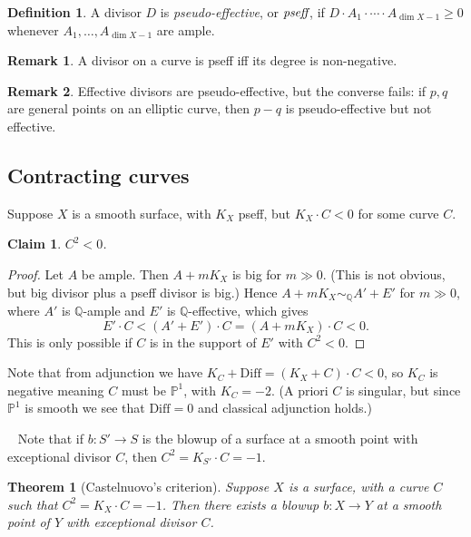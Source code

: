 \documentclass{article}
\newtheorem*{theorem}{Theorem}
\newtheorem*{claim}{Claim}
\theoremstyle{definition}
\newtheorem*{definition}{Definition}
\newtheorem*{remark}{Remark}
\newcommand{\Diff}{\mathrm{Diff}}
\renewcommand{\P}{\mathbb{P}}
\newcommand{\Q}{\mathbb{Q}}
\begin{document}
\begin{definition}
    A divisor $D$ is \emph{pseudo-effective}, or $\emph{pseff}$, if
    $D\cdot A_1\cdot\cdots\cdot A_{\dim X-1}\ge0$ whenever
    $A_1,\ldots,A_{\dim X-1}$ are ample.
\end{definition}

\begin{remark}
    A divisor on a curve is pseff iff its degree is non-negative.
\end{remark}

\begin{remark}
    Effective divisors are pseudo-effective, but the converse fails: if $p,q$
    are general points on an elliptic curve, then $p-q$ is pseudo-effective but
    not effective.
\end{remark}

\subsection*{Contracting curves}

Suppose $X$ is a smooth surface, with $K_X$ pseff, but $K_X\cdot C<0$ for some
curve $C$.

\begin{claim}
    $C^2<0$.
\end{claim}

\begin{proof}
    Let $A$ be ample. Then $A+mK_X$ is big for $m\gg0$. (This is not obvious,
    but big divisor plus a pseff divisor is big.) Hence $A+mK_X\sim_\Q A'+E'$
    for $m\gg0$, where $A'$ is $\Q$-ample and $E'$ is $\Q$-effective, which
    gives
    \begin{equation*}
        E'\cdot C < (A'+E')\cdot C = (A+mK_X)\cdot C < 0.
    \end{equation*}
    This is only possible if $C$ is in the support of $E'$ with $C^2<0$.
\end{proof}

Note that from adjunction we have $K_C+\Diff=(K_X+C)\cdot C<0$, so $K_C$ is
negative meaning $C$ must be $\P^1$, with $K_C=-2$. (A priori $C$ is singular,
but since $\P^1$ is smooth we see that $\Diff=0$ and classical adjunction
holds.)

~
Note that if $b:S'\to S$ is the blowup of a surface at a smooth point with
exceptional divisor $C$, then $C^2=K_{S'}\cdot C=-1$.

\begin{theorem}[Castelnuovo's criterion]
    Suppose $X$ is a surface, with a curve $C$ such that $C^2=K_X\cdot C=-1$.
    Then there exists a blowup $b:X\to Y$ at a smooth point of $Y$ with
    exceptional divisor $C$.
\end{theorem}
\end{document}
